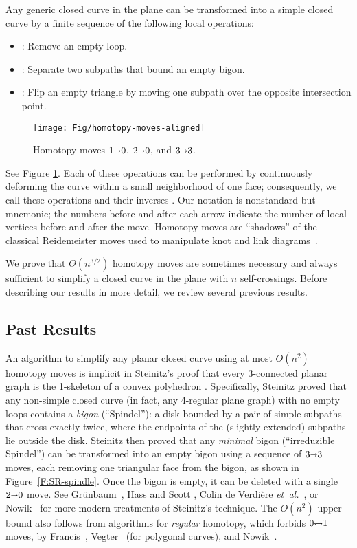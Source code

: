 \documentclass[11pt,twoside]{article}
\def\shortleftrightarrow{{\rlap{$\mathord\shortleftarrow$}\,\mathord\shortrightarrow}}
\def\arcto{\mathord\shortrightarrow}
\def\arc#1#2{#1\arcto#2}
\def\biarc#1#2{#1\mathord\shortleftrightarrow#2}
\def\etal{\emph{et~al.}}			%
\numberwithin{figure}{section}
\begin{document}
Any generic closed curve in the plane can be transformed into a simple closed curve by a finite sequence of the following local operations:
\begin{itemize}\itemsep0pt
\item \EMPH{$\arc{1}{0}$}: Remove an empty loop.
\item \EMPH{$\arc{2}{0}$}: Separate two subpaths that bound an empty bigon.
\item \EMPH{$\arc{3}{3}$}: Flip an empty triangle by moving one subpath over the opposite intersection point.
\end{itemize}
%
\begin{figure}[h]
\centering
\texttt{[image: Fig/homotopy-moves-aligned]}\\
\caption{Homotopy moves $\arc10$, $\arc20$, and $\arc33$.}
\label{F:homotopy}
\end{figure}
%
See Figure \ref{F:homotopy}. Each of these operations can be performed by continuously deforming the curve within a small neighborhood of one face; consequently, we call these operations and their inverses . Our notation is nonstandard but mnemonic; the numbers before and after each arrow indicate the number of local vertices before and after the move. Homotopy moves are “shadows” of the classical Reidemeister moves used to manipulate knot and link diagrams~\cite{ab-tkc-26,r-ebk-27}.

We prove that $\Theta(n^{3/2})$ homotopy moves are sometimes necessary and always sufficient to simplify a closed curve in the plane with $n$ self-crossings.  Before describing our results in more detail, we review several previous results.

\subsection{Past Results}

An algorithm to simplify any planar closed curve using at most $O(n^2)$ homotopy moves is implicit in Steinitz's proof that every 3-connected planar graph is the 1-skeleton of a convex polyhedron \cite{s-pr-1916,sr-vtp-34}. Specifically, Steinitz proved that any non-simple closed curve (in fact, any 4-regular plane graph) with no empty loops contains a \emph{bigon} (“Spindel”): a disk bounded by a pair of simple subpaths that cross exactly twice, where the endpoints of the (slightly extended) subpaths lie outside the disk.  Steinitz then proved that any \emph{minimal} bigon (“irreduzible Spindel”) can be transformed into an empty bigon using a sequence of $\arc33$ moves, each removing one triangular face from the bigon, as shown in Figure~\ref{F:SR-spindle}.  Once the bigon is empty, it can be deleted with a single $\arc20$ move. See Grünbaum~\cite{g-cp-67}, Hass and Scott \cite{hs-scs-94}, Colin de Verdière \etal~\cite{cgv-rep-96}, or Nowik~\cite{n-cpsc-09} for more modern treatments of Steinitz's technique. The $O(n^2)$ upper bound also follows from algorithms for \emph{regular} homotopy, which forbids $\biarc01$ moves, by Francis~\cite{f-frtcs-69}, Vegter~\cite{v-kfdp-89} (for polygonal curves), and Nowik~\cite{n-cpsc-09}.
\end{document}
